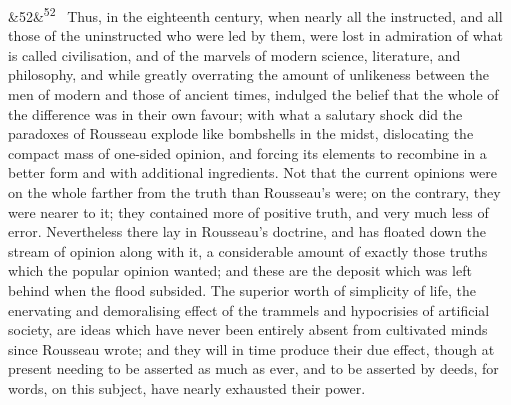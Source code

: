 \documentclass[12pt]{article}
\newcommand{\para}[1][]{\par\noindent\ifx&#1&\else\textsuperscript{\footnotesize #1}~\fi}
\begin{document}
\para[52] Thus, in the eighteenth century, when nearly all the instructed, and all those of the uninstructed who were led by them, were lost in admiration of what is called civilisation, and of the marvels of modern science, literature, and philosophy, and while greatly overrating the amount of unlikeness between the men of modern and those of ancient times, indulged the belief that the whole of the difference was in their own favour; with what a salutary shock did the paradoxes of Rousseau explode like bombshells in the midst, dislocating the compact mass of one-sided opinion, and forcing its elements to recombine in a better form and with additional ingredients. Not that the current opinions were on the whole farther from the truth than Rousseau's were; on the contrary, they were nearer to it; they contained more of positive truth, and very much less of error. Nevertheless there lay in Rousseau's doctrine, and has floated down the stream of opinion along with it, a considerable amount of exactly those truths which the popular opinion wanted; and these are the deposit which was left behind when the flood subsided. The superior worth of simplicity of life, the enervating and demoralising effect of the trammels and hypocrisies of artificial society, are ideas which have never been entirely absent from cultivated minds since Rousseau wrote; and they will in time produce their due effect, though at present needing to be asserted as much as ever, and to be asserted by deeds, for words, on this subject, have nearly exhausted their power.
\end{document}
